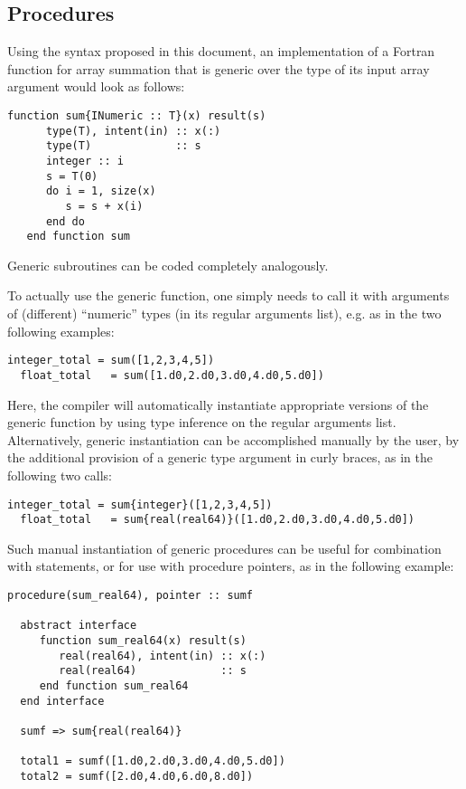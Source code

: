 \documentclass[11pt,oneside]{report}
\newcommand{\code}[1]{{\selectfont\ttfamily{#1}}}
\begin{document}
\subsection{Procedures}
\label{sect:generic_procedures}

Using the syntax proposed in this document, an implementation of a
Fortran function for array summation that is generic over the type of its
input array argument would look as follows:
\begin{lstlisting}[language=LFortran,style=boxed]
   function sum{INumeric :: T}(x) result(s)
      type(T), intent(in) :: x(:)
      type(T)             :: s
      integer :: i
      s = T(0)
      do i = 1, size(x)
         s = s + x(i)
      end do
   end function sum
\end{lstlisting}
Generic subroutines can be coded completely analogously.

To actually use the \code{sum} generic function, one simply needs to
call it with arguments of (different) ``numeric'' types (in its
regular arguments list), e.g. as in the two following examples:
\begin{lstlisting}[language=LFortran,style=boxed]
  integer_total = sum([1,2,3,4,5])
  float_total   = sum([1.d0,2.d0,3.d0,4.d0,5.d0])
\end{lstlisting}
Here, the compiler will automatically instantiate appropriate versions
of the \code{sum} generic function by using type inference on the
regular arguments list. Alternatively, generic instantiation can be
accomplished manually by the user, by the additional provision of a
generic type argument in curly braces, as in the following two calls:
\begin{lstlisting}[language=LFortran,style=boxed]
  integer_total = sum{integer}([1,2,3,4,5])
  float_total   = sum{real(real64)}([1.d0,2.d0,3.d0,4.d0,5.d0])
\end{lstlisting}
Such manual instantiation of generic procedures can be useful for
combination with \code{associate} statements, or for use with
procedure pointers, as in the following example:
\begin{lstlisting}[language=LFortran,style=boxed]
  procedure(sum_real64), pointer :: sumf

  abstract interface
     function sum_real64(x) result(s)
        real(real64), intent(in) :: x(:)
        real(real64)             :: s
     end function sum_real64  
  end interface
  
  sumf => sum{real(real64)}

  total1 = sumf([1.d0,2.d0,3.d0,4.d0,5.d0])
  total2 = sumf([2.d0,4.d0,6.d0,8.d0])
\end{lstlisting}
\end{document}
